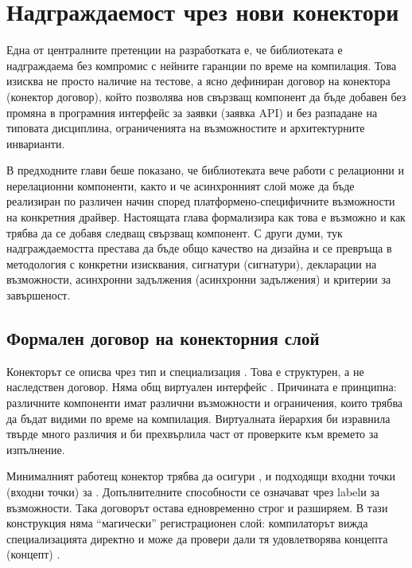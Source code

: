 \section{Надграждаемост чрез нови конектори}
\label{sec:verification_extensibility}

Една от централните претенции на разработката е, че библиотеката е надграждаема без компромис с нейните гаранции по време на компилация. Това изисква не просто наличие на тестове, а ясно дефиниран договор на конектора (конектор договор), който позволява нов свързващ компонент да бъде добавен без промяна в програмния интерфейс за заявки (заявка API) и без разпадане на типовата дисциплина, ограниченията на възможностите и архитектурните инварианти.

В предходните глави беше показано, че библиотеката вече работи с релационни и нерелационни компоненти, както и че асинхронният слой може да бъде реализиран по различен начин според платформено-специфичните възможности на конкретния драйвер. Настоящата глава формализира как това е възможно и как трябва да се добавя следващ свързващ компонент. С други думи, тук надграждаемостта престава да бъде общо качество на дизайна и се превръща в методология с конкретни изисквания, сигнатури (сигнатури), декларации на възможности, асинхронни задължения (асинхронни задължения) и критерии за завършеност.

\subsection{Формален договор на конекторния слой}

Конекторът се описва чрез тип  и специализация . Това е структурен, а не наследствен договор. Няма общ виртуален интерфейс . Причината е принципна: различните компоненти имат различни възможности и ограничения, които трябва да бъдат видими по време на компилация. Виртуалната йерархия би изравнила твърде много различия и би прехвърлила част от проверките към времето за изпълнение.

Минималният работещ конектор трябва да осигури ,  и подходящи входни точки (входни точки) за . Допълнителните способности се означават чрез labelи за възможности. Така договорът остава едновременно строг и разширяем. В тази конструкция няма ``магически'' регистрационен слой: компилаторът вижда специализацията директно и може да провери дали тя удовлетворява концепта (концепт) .

